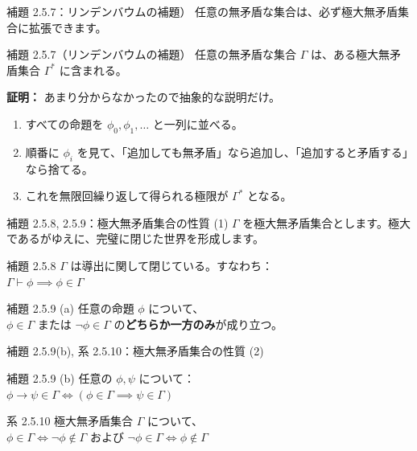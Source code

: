 \documentclass[unicode,10pt]{beamer}
\begin{document}
\begin{frame}{補題 2.5.7：リンデンバウムの補題）}
    任意の無矛盾な集合は、必ず極大無矛盾集合に拡張できます。

    \begin{block}{補題 2.5.7（リンデンバウムの補題）}
        任意の無矛盾な集合 $\Gamma$ は、ある極大無矛盾集合 $\Gamma^*$ に含まれる。
    \end{block}
    
    \textbf{証明：}
    あまり分からなかったので抽象的な説明だけ。
    \begin{enumerate}
        \item すべての命題を $\phi_0, \phi_1, \dots$ と一列に並べる。
        \item 順番に $\phi_i$ を見て、「追加しても無矛盾」なら追加し、「追加すると矛盾する」なら捨てる。
        \item これを無限回繰り返して得られる極限が $\Gamma^*$ となる。
    \end{enumerate}
\end{frame}

\begin{frame}{補題 2.5.8, 2.5.9：極大無矛盾集合の性質 (1)}
    $\Gamma$ を極大無矛盾集合とします。極大であるがゆえに、完璧に閉じた世界を形成します。

    \begin{block}{補題 2.5.8}
        $\Gamma$ は導出に関して閉じている。すなわち：\\
        $\Gamma \vdash \phi \implies \phi \in \Gamma$
    \end{block}

    \begin{block}{補題 2.5.9 (a)}
        任意の命題 $\phi$ について、\\
        $\phi \in \Gamma$ または $\neg \phi \in \Gamma$ の\textbf{どちらか一方のみ}が成り立つ。
    \end{block}
\end{frame}

\begin{frame}{補題 2.5.9(b), 系 2.5.10：極大無矛盾集合の性質 (2)}
    \begin{block}{補題 2.5.9 (b)}
        任意の $\phi, \psi$ について：\\
        $\phi \to \psi \in \Gamma \iff (\phi \in \Gamma \implies \psi \in \Gamma)$
    \end{block}

    \begin{block}{系 2.5.10}
        極大無矛盾集合 $\Gamma$ について、\\
        $\phi \in \Gamma \iff \neg \phi \notin \Gamma$ \quad および \quad $\neg \phi \in \Gamma \iff \phi \notin \Gamma$
    \end{block}
\end{frame}
\end{document}
